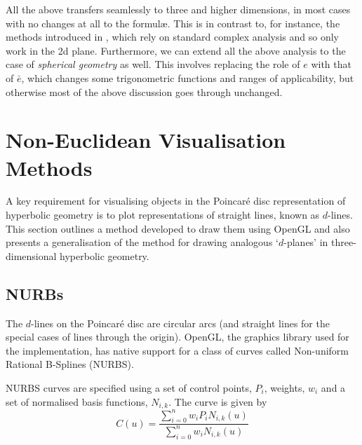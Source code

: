 All the above transfers seamlessly to three and higher dimensions, in
most cases with no changes at all to the formul\ae. This is in
contrast to, for instance, the methods introduced in \cite{GEOM:Brannan}, which
rely on standard complex analysis and so only work in the 2d
plane. Furthermore, we can extend all the above analysis to the
case of \textit{spherical geometry} as well. This involves
replacing the role of $e$ with that of $\bar{e}$, which changes
some trigonometric functions and ranges of applicability, but
otherwise most of the above discussion goes through unchanged.


\section{Non-Euclidean Visualisation Methods}
\label{sec:noneuclid-vis}

A key requirement for visualising objects in the Poincar\'e disc
representation of hyperbolic geometry is to plot representations of
straight lines, known as $d$-lines. This section outlines a method 
developed to draw them using OpenGL and also presents a generalisation
of the method for drawing analogous `$d$-planes' in three-dimensional
hyperbolic geometry.

\subsection{NURBs}

The $d$-lines on the Poincar\'e disc are circular arcs (and straight lines
for the special cases of lines through the origin). OpenGL, the graphics
library used for the implementation, has native support for a class
of curves called Non-uniform Rational B-Splines (NURBS)\cite{mecg}. 


NURBS curves are specified using a set of control points, $P_i$,
weights, $w_i$ and a set of normalised basis functions, $N_{i,k}$.
The curve is given by
\[
C(u) = \frac{\sum_{i=0}^n w_i P_i N_{i,k}(u)}{\sum_{i=0}^n w_i N_{i,k}(u)}
\]

